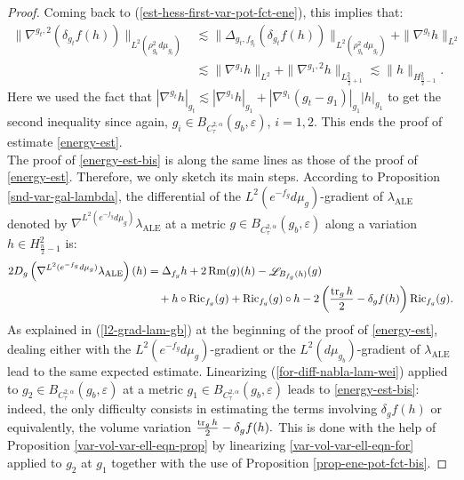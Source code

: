 \documentclass[a4paper,11pt,reqno]{amsart}
\def\Ric{\mathop{\rm Ric}\nolimits}
\def\Rm{\mathop{\rm Rm}\nolimits}
\def\tr{\mathop{\rm tr}\nolimits}
\def\Li{\mathop{\rm \mathscr{L}}\nolimits}
\def\Ric{\mathop{\rm Ric}\nolimits}
\def\Rm{\mathop{\rm Rm}\nolimits}
\def\tr{\mathop{\rm tr}\nolimits}
\def\Li{\mathop{\rm \mathscr{L}}\nolimits}
\numberwithin{equation}{section}
\begin{document}
\begin{proof}
		
		Coming back to (\ref{est-hess-first-var-pot-fct-ene}), this implies that:
		\begin{equation}
		\begin{split}
		\|\nabla^{g_t,2}\left(\delta_{g_t}f(h)\right)\|_{L^2(\rho_{g_b}^2d\mu_{g_t})}&\lesssim\|\Delta_{g_t,f_{g_t}}\left(\delta_{g_t}f(h)\right)\|_{L^2(\rho_{g_b}^2d\mu_{g_t})}+\|\nabla^{g_t}h\|_{L^2}\\
		&\lesssim \|\nabla^{g_1}h\|_{L^2}+\|\nabla^{g_1,2}h\|_{L^2_{\frac{n}{2}+1}}\lesssim \|h\|_{H^2_{\frac{n}{2}-1}}.
		\end{split}
		\end{equation}
		Here we used the fact that $|\nabla^{g_t}h|_{g_t}\lesssim |\nabla^{g_1}h|_{g_1}+|\nabla^{g_1}(g_t-g_1)|_{g_1}|h|_{g_1}$  to get the second inequality since again, $g_i\in B_{C^{2,\alpha}_{\tau}}(g_b,\varepsilon)$, $i=1,2$. This ends the proof of estimate \eqref{energy-est}.\\
			
			The proof of \eqref{energy-est-bis} is along the same lines as those of the proof of \eqref{energy-est}. Therefore, we only sketch its main steps. According to 	Proposition \ref{snd-var-gal-lambda}, the differential of the $L^{2}(e^{-f_g}d\mu_g)$-gradient of $\lambda_{\operatorname{ALE}}$ denoted by $\nabla^{L^2(e^{-f_g}d\mu_g)}\lambda_{\operatorname{ALE}}$ at a metric $g\in B_{C^{2,\alpha}_{\tau}}(g_b,\varepsilon)$ along a variation $h\in H^2_{\frac{n}{2}-1}$ is:
			\begin{equation}
			\begin{split}\label{for-diff-nabla-lam-wei}
			2D_g\left(\nabla^{L^2(e^{-f_g}d\mu_g)}\lambda_{\operatorname{ALE}}\right)(h)&=\Delta_{f_g}h+2\Rm(g)(h)-\Li_{B_{f_g}(h)}(g)\\
			&\quad+h\circ\Ric_{f_g}(g)+\Ric_{f_g}(g)\circ h-2\left(\frac{\tr_gh}{2}-\delta_gf(h)\right)\Ric_{f_g}(g).
			\end{split}
			\end{equation}
			As explained in (\ref{l2-grad-lam-gb}) at the beginning of the proof of \eqref{energy-est}, dealing either with the $L^{2}(e^{-f_g}d\mu_g)$-gradient or the $L^{2}(d\mu_{g_b})$-gradient of $\lambda_{\operatorname{ALE}}$ lead to the same expected estimate. Linearizing (\ref{for-diff-nabla-lam-wei}) applied to $g_2\in B_{C^{2,\alpha}_{\tau}}(g_b,\varepsilon)$ at a metric $g_1\in B_{C^{2,\alpha}_{\tau}}(g_b,\varepsilon)$ leads to \eqref{energy-est-bis}: indeed, the only difficulty consists in estimating the terms involving $\delta_gf(h)$ or equivalently, the volume variation $\frac{\tr_gh}{2}-\delta_gf(h).$ This is done with the help of Proposition \ref{var-vol-var-ell-eqn-prop} by linearizing \eqref{var-vol-var-ell-eqn-for} applied to $g_2$ at $g_1$ together with the use of Proposition \ref{prop-ene-pot-fct-bis}.
	\end{proof}
	
\end{document}
